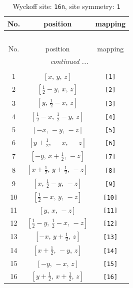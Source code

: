 \documentclass[fleqn,8pt]{jsarticle}
\begin{document}
\begin{longtable}{ccc}
\caption{Wyckoff site: {\tt 16n}, site symmetry: {\tt 1}}
 \\
 \hline \hline
No. & position & mapping \\ \hline \endfirsthead

\multicolumn{2}{l}{\tablename\ \thetable{}} \\
 \hline \hline
No. & position & mapping \\ \hline \endhead

 \hline \hline
\multicolumn{2}{r}{\footnotesize\it continued ...} \\ \endfoot

 \hline \hline
\multicolumn{2}{r}{} \\ \endlastfoot

1 & $\left[ x,\, y,\, z \right]$ & {\tt [1]} \\ \hline
2 & $\left[ \frac{1}{2} - y,\, x,\, z \right]$ & {\tt [2]} \\ \hline
3 & $\left[ y,\, \frac{1}{2} - x,\, z \right]$ & {\tt [3]} \\ \hline
4 & $\left[ \frac{1}{2} - x,\, \frac{1}{2} - y,\, z \right]$ & {\tt [4]} \\ \hline
5 & $\left[ - x,\, - y,\, - z \right]$ & {\tt [5]} \\ \hline
6 & $\left[ y + \frac{1}{2},\, - x,\, - z \right]$ & {\tt [6]} \\ \hline
7 & $\left[ - y,\, x + \frac{1}{2},\, - z \right]$ & {\tt [7]} \\ \hline
8 & $\left[ x + \frac{1}{2},\, y + \frac{1}{2},\, - z \right]$ & {\tt [8]} \\ \hline
9 & $\left[ x,\, \frac{1}{2} - y,\, - z \right]$ & {\tt [9]} \\ \hline
10 & $\left[ \frac{1}{2} - x,\, y,\, - z \right]$ & {\tt [10]} \\ \hline
11 & $\left[ y,\, x,\, - z \right]$ & {\tt [11]} \\ \hline
12 & $\left[ \frac{1}{2} - y,\, \frac{1}{2} - x,\, - z \right]$ & {\tt [12]} \\ \hline
13 & $\left[ - x,\, y + \frac{1}{2},\, z \right]$ & {\tt [13]} \\ \hline
14 & $\left[ x + \frac{1}{2},\, - y,\, z \right]$ & {\tt [14]} \\ \hline
15 & $\left[ - y,\, - x,\, z \right]$ & {\tt [15]} \\ \hline
16 & $\left[ y + \frac{1}{2},\, x + \frac{1}{2},\, z \right]$ & {\tt [16]} \\
\end{longtable}
\end{document}
